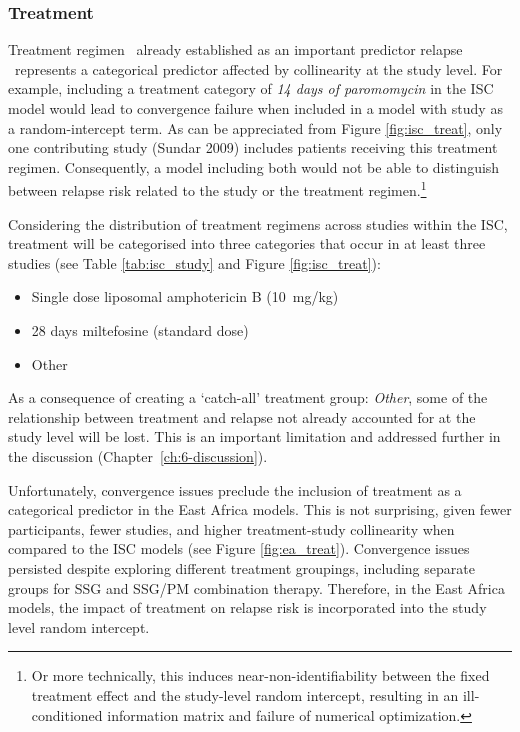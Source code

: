\subsubsection{Treatment}

Treatment regimen \textemdash\ already established as an important predictor relapse \textemdash\ represents a categorical predictor affected by collinearity at the study level. For example, including a treatment category of \textit{14 days of paromomycin} in the ISC model would lead to convergence failure when included in a model with study as a random-intercept term. As can be appreciated from Figure \ref{fig:isc_treat}, only one contributing study (Sundar 2009) includes patients receiving this treatment regimen. Consequently, a model including both would not be able to distinguish between relapse risk related to the study or the treatment regimen.\footnote{Or more technically, this induces near-non-identifiability between the fixed treatment effect and the study-level random intercept, resulting in an ill-conditioned information matrix and failure of numerical optimization.}

Considering the distribution of treatment regimens across studies within the ISC, treatment will be categorised into three categories that occur in at least three studies (see Table \ref{tab:isc_study} and Figure \ref{fig:isc_treat}):

\begin{itemize}[noitemsep]
  \item Single dose liposomal amphotericin B (10~mg/kg)
  \item 28 days miltefosine (standard dose)
  \item Other
\end{itemize}

As a consequence of creating a `catch-all' treatment group: \emph{Other}, some of the relationship between treatment and relapse not already accounted for at the study level will be lost. This is an important limitation and addressed further in the discussion (Chapter~\ref{ch:6-discussion}).

Unfortunately, convergence issues preclude the inclusion of treatment as a categorical predictor in the East Africa models. This is not surprising, given fewer participants, fewer studies, and higher treatment-study collinearity when compared to the ISC models (see Figure \ref{fig:ea_treat}). Convergence issues persisted despite exploring different treatment groupings, including separate groups for SSG and SSG/PM combination therapy. Therefore, in the East Africa models, the impact of treatment on relapse risk is incorporated into the study level random intercept.

